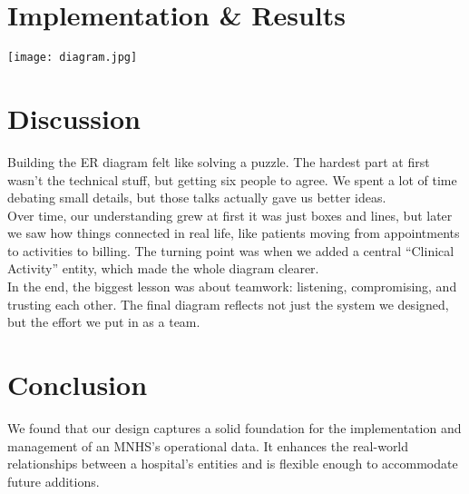 \documentclass[a4paper,12pt]{article}
\begin{document}
\section{Implementation \& Results}
\texttt{[image: diagram.jpg]}


\section{Discussion}
Building the ER diagram felt like solving a puzzle. The hardest part at first wasn’t the technical stuff, but getting six people to agree. We spent a lot of time debating small details, but those talks actually gave us better ideas.\\
Over time, our understanding grew at first it was just boxes and lines, but later we saw how things connected in real life, like patients moving from appointments to activities to billing. The turning point was when we added a central “Clinical Activity” entity, which made the whole diagram clearer.\\
In the end, the biggest lesson was about teamwork: listening, compromising, and trusting each other. The final diagram reflects not just the system we designed, but the effort we put in as a team.

\section{Conclusion}
We found that our design captures a solid foundation for the implementation and management of an MNHS’s operational data. It enhances the real-world relationships between a hospital's entities and is flexible enough to accommodate future additions.
\end{document}
